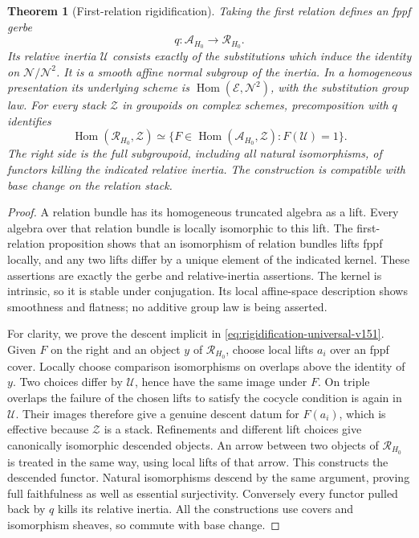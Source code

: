 \documentclass[11pt,reqno]{amsart}
\numberwithin{equation}{section}
\newtheorem{theorem}{Theorem}[section]
\theoremstyle{definition}\newtheorem{definition}[theorem]{Definition}
\theoremstyle{remark}\newtheorem{remark}[theorem]{Remark}
\DeclareMathOperator{\Hom}{Hom}\DeclareMathOperator{\Tot}{Tot}
\begin{document}
\begin{theorem}[First-relation rigidification]
\label{thm:rigidification-v151}
Taking the first relation defines an fppf gerbe
\[
                      q:\mathscr A_{H_0}\longrightarrow\mathscr R_{H_0}.
\]
Its relative inertia \(\mathscr U\) consists exactly of the
substitutions which induce the identity on \(\mathcal N/\mathcal N^2\).
It is a smooth affine normal subgroup of the inertia.  In a homogeneous
presentation its underlying scheme is
\(\Hom(\mathcal E,\mathcal N^2)\), with the substitution group law.
For every stack \(\mathscr Z\) in groupoids on complex schemes,
precomposition with \(q\) identifies
\begin{equation}\label{eq:rigidification-universal-v151}
 \Hom(\mathscr R_{H_0},\mathscr Z)
 \simeq
 \{F\in\Hom(\mathscr A_{H_0},\mathscr Z):F(\mathscr U)=1\}.
\end{equation}
The right side is the full subgroupoid, including all natural
isomorphisms, of functors killing the indicated relative inertia.
The construction is compatible with base change on the relation stack.
\end{theorem}
\begin{proof}
A relation bundle has its homogeneous truncated algebra as a lift.
Every algebra over that relation bundle is locally isomorphic to this
lift.  The first-relation proposition shows that an isomorphism of
relation bundles lifts fppf locally, and any two lifts differ by a
unique element of the indicated kernel.  These assertions are exactly
the gerbe and relative-inertia assertions.  The kernel is intrinsic,
so it is stable under conjugation.  Its local affine-space description
shows smoothness and flatness; no additive group law is being asserted.

For clarity, we prove the descent implicit in
\eqref{eq:rigidification-universal-v151}.  Given \(F\) on the right
and an object \(y\) of \(\mathscr R_{H_0}\), choose local lifts
\(a_i\) over an fppf cover.  Locally choose comparison isomorphisms
on overlaps above the identity of \(y\).  Two choices differ by
\(\mathscr U\), hence have the same image under \(F\).  On triple
overlaps the failure of the chosen lifts to satisfy the cocycle
condition is again in \(\mathscr U\).  Their images therefore give
a genuine descent datum for \(F(a_i)\), which is effective because
\(\mathscr Z\) is a stack.  Refinements and different lift choices
give canonically isomorphic descended objects.  An arrow between two
objects of \(\mathscr R_{H_0}\) is treated in the same way, using
local lifts of that arrow.  This constructs the descended functor.
Natural isomorphisms descend by the same argument, proving full
faithfulness as well as essential surjectivity.  Conversely every
functor pulled back by \(q\) kills its relative inertia.  All the
constructions use covers and isomorphism sheaves, so commute with
base change.
\end{proof}
\end{document}
